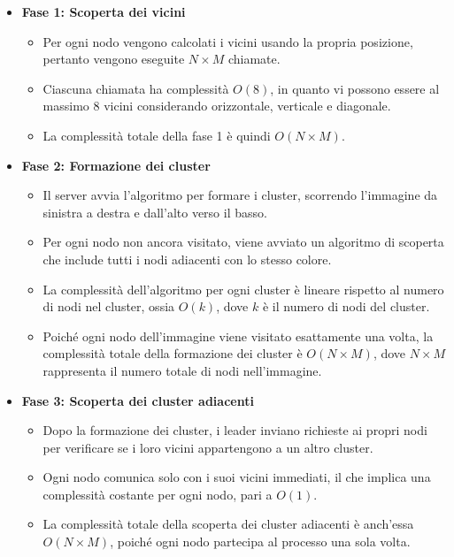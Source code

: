 \documentclass[12pt, a4paper]{report}
\begin{document}
\vspace{-5pt}
\begin{itemize}
    \item \textbf{Fase 1: Scoperta dei vicini}
    \vspace{-5pt}
    \begin{itemize}
      \item Per ogni nodo vengono calcolati i vicini usando la propria posizione, pertanto vengono eseguite $N \times M$ chiamate.
      \item Ciascuna chiamata ha complessit\`a $O(8)$, in quanto vi possono essere al massimo 8 vicini considerando orizzontale, verticale e diagonale.
      \item La complessit\`a totale della fase 1 \`e quindi $O(N \times M)$.
    \end{itemize}

    \item \textbf{Fase 2: Formazione dei cluster}
    \begin{itemize}
        \item Il server avvia l'algoritmo per formare i cluster, scorrendo l'immagine da sinistra a destra e dall'alto verso il basso.
        \item Per ogni nodo non ancora visitato, viene avviato un algoritmo di scoperta che include tutti i nodi adiacenti con lo stesso colore.
        \item La complessit\`a dell'algoritmo per ogni cluster \`e lineare rispetto al numero di nodi nel cluster, ossia $O(k)$, dove $k$ \`e il numero di nodi del cluster.
        \item Poiché ogni nodo dell'immagine viene visitato esattamente una volta, la complessit\`a totale della formazione dei cluster \`e $O(N \times M)$, dove $N \times M$ rappresenta il numero totale di nodi nell'immagine.
    \end{itemize}

    \item \textbf{Fase 3: Scoperta dei cluster adiacenti}
    \begin{itemize}
        \item Dopo la formazione dei cluster, i leader inviano richieste ai propri nodi per verificare se i loro vicini appartengono a un altro cluster.
        \item Ogni nodo comunica solo con i suoi vicini immediati, il che implica una complessit\`a costante per ogni nodo, pari a $O(1)$.
        \item La complessit\`a totale della scoperta dei cluster adiacenti \`e anch'essa $O(N \times M)$, poiché ogni nodo partecipa al processo una sola volta.
    \end{itemize}


\end{itemize}
\end{document}
